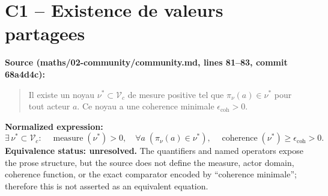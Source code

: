\section*{C1 -- Existence de valeurs partagees}
\textbf{Source (maths/02-community/community.md, lines 81--83, commit 68a4d4c):}
\begin{quote}
Il existe un noyau $\nu^*\subset\mathcal{V}_c$ de mesure positive tel que
$\pi_{\nu}(a)\in\nu^*$ pour tout acteur $a$. Ce noyau a une coherence minimale
$\epsilon_{\mathrm{coh}}>0$.
\end{quote}
\textbf{Normalized expression:}
\[
\exists\,\nu^*\subset\mathcal{V}_c:\quad
\operatorname{measure}(\nu^*)>0,\quad
\forall a\;(\pi_\nu(a)\in\nu^*),\quad
\operatorname{coherence}(\nu^*)\geq\epsilon_{\mathrm{coh}}>0.
\]
\textbf{Equivalence status: unresolved.}
The quantifiers and named operators expose the prose structure, but the source does
not define the measure, actor domain, coherence function, or the exact comparator
encoded by ``coherence minimale''; therefore this is not asserted as an equivalent equation.
